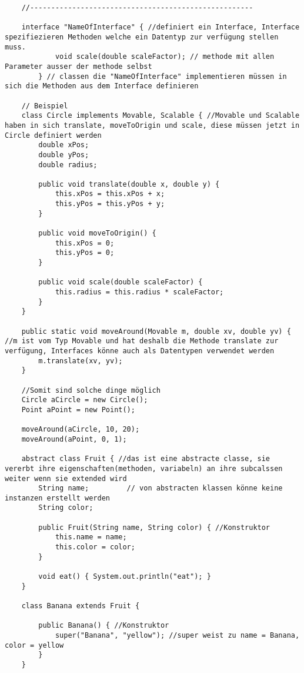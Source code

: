 \documentclass[a4paper,12pt]{article}
\begin{document}
\begin{lstlisting}
    //-----------------------------------------------------

    interface "NameOfInterface" { //definiert ein Interface, Interface spezifiezieren Methoden welche ein Datentyp zur verfügung stellen muss. 
            void scale(double scaleFactor); // methode mit allen Parameter ausser der methode selbst
        } // classen die "NameOfInterface" implementieren müssen in sich die Methoden aus dem Interface definieren

    // Beispiel
    class Circle implements Movable, Scalable { //Movable und Scalable haben in sich translate, moveToOrigin und scale, diese müssen jetzt in Circle definiert werden
        double xPos;
        double yPos;
        double radius;

        public void translate(double x, double y) {
            this.xPos = this.xPos + x;
            this.yPos = this.yPos + y;
        }

        public void moveToOrigin() {
            this.xPos = 0;
            this.yPos = 0;
        }

        public void scale(double scaleFactor) {
            this.radius = this.radius * scaleFactor;
        }
    }

    public static void moveAround(Movable m, double xv, double yv) { //m ist vom Typ Movable und hat deshalb die Methode translate zur verfügung, Interfaces könne auch als Datentypen verwendet werden
        m.translate(xv, yv);
    }

    //Somit sind solche dinge möglich
    Circle aCircle = new Circle();
    Point aPoint = new Point();

    moveAround(aCircle, 10, 20);
    moveAround(aPoint, 0, 1);

    abstract class Fruit { //das ist eine abstracte classe, sie vererbt ihre eigenschaften(methoden, variabeln) an ihre subcalssen weiter wenn sie extended wird
        String name;         // von abstracten klassen könne keine instanzen erstellt werden
        String color;

        public Fruit(String name, String color) { //Konstruktor
            this.name = name;
            this.color = color;
        }
        
        void eat() { System.out.println("eat"); }
    }

    class Banana extends Fruit {

        public Banana() { //Konstruktor
            super("Banana", "yellow"); //super weist zu name = Banana, color = yellow
        }
    }





\end{lstlisting}
\end{document}
